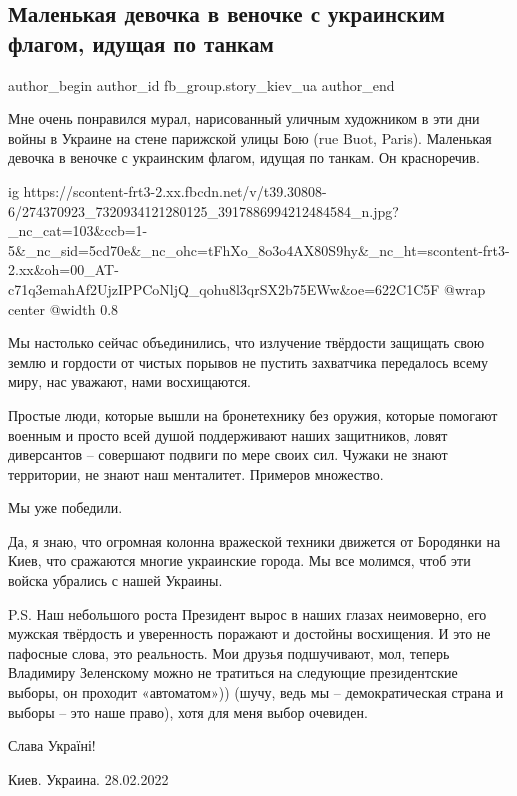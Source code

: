  
 
 
 
 
 
\subsection{Маленькая девочка в веночке с украинским флагом, идущая по танкам}
\label{sec:28_02_2022.fb.fb_group.story_kiev_ua.3.mural}
 
\ifcmt
 author_begin
   author_id fb_group.story_kiev_ua
 author_end
\fi

Мне очень понравился мурал, нарисованный уличным художником  в эти дни войны в
Украине на стене парижской улицы Бою (rue Buot, Paris). Маленькая девочка в
веночке с украинским флагом, идущая по танкам. Он красноречив. 

\ifcmt
  ig https://scontent-frt3-2.xx.fbcdn.net/v/t39.30808-6/274370923_7320934121280125_3917886994212484584_n.jpg?_nc_cat=103&ccb=1-5&_nc_sid=5cd70e&_nc_ohc=tFhXo_8o3o4AX80S9hy&_nc_ht=scontent-frt3-2.xx&oh=00_AT-c71q3emahAf2UjzIPPCoNljQ_qohu8l3qrSX2b75EWw&oe=622C1C5F
  @wrap center
  @width 0.8
\fi

Мы настолько сейчас объединились, что излучение твёрдости защищать свою землю и
гордости от чистых порывов не пустить захватчика передалось всему  миру, нас
уважают, нами восхищаются.

Простые люди, которые вышли на бронетехнику без оружия, которые помогают
военным и просто всей душой поддерживают наших защитников, ловят диверсантов  –
совершают подвиги по мере своих сил. Чужаки не знают территории, не знают наш
менталитет.  Примеров множество.

Мы уже победили. 

Да, я знаю, что огромная колонна вражеской техники движется от Бородянки на
Киев, что сражаются многие украинские города. Мы все молимся, чтоб эти войска
убрались с нашей Украины. 

P.S. Наш небольшого роста Президент вырос в наших глазах неимоверно, его
мужская твёрдость и уверенность поражают и достойны восхищения. И это не
пафосные слова, это реальность. Мои друзья подшучивают, мол, теперь Владимиру
Зеленскому можно не тратиться на следующие президентские выборы, он проходит
«автоматом»)) (шучу, ведь мы – демократическая страна и выборы – это наше
право), хотя для меня выбор очевиден.

Слава Україні!

Киев. Украина. 28.02.2022

